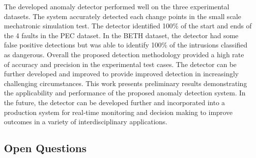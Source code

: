 The developed anomaly detector performed well on the three experimental datasets. The system accurately detected each change points in the small scale mechatronic simulation test. The detector identified 100\% of the start and ends of the 4 faults in the PEC dataset. In the BETH dataset, the detector had some false positive detections but was able to identify 100\% of the intrusions classified as dangerous. Overall the proposed detection methodology provided a high rate of accuracy and precision in the experimental test cases. The detector can be further developed and improved to provide improved detection in increasingly challenging circumstances. This work presents preliminary results demonstrating the applicability and performance of the proposed anomaly detection system. In the future, the detector can be developed further and incorporated into a production system for real-time monitoring and decision making to improve outcomes in a variety of interdisciplinary applications. 

\subsection{Open Questions}


